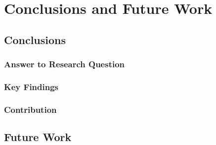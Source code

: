 \chapter{Conclusions and Future Work} %
\label{ConclusionsAndFutureWork}


\section{Conclusions}

\subsection{Answer to Research Question}

\subsection{Key Findings}

\subsection{Contribution}

\section{Future Work}

